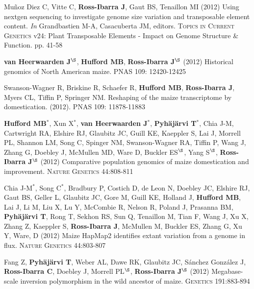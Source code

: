 \begin{etaremune}
\item Mu\~{n}oz Diez C, Vitte C, {\bf Ross-Ibarra J}, Gaut BS, Tenaillon MI (2012) Using nextgen sequencing to investigate genome size variation and transposable element content. \emph{In} Grandbastien M-A, Casacuberta JM, editors. \textsc{Topics in Current Genetics} v24: Plant Transposable Elements - Impact on Genome Structure \& Function. pp. 41-58


\item  {\bf van Heerwaarden J}$^\S$, {\bf Hufford MB}, {\bf Ross-Ibarra J}$^\S$ (2012) Historical genomics of North American maize. \textsc{PNAS} 109: 12420-12425


\item Swanson-Wagner R, Briskine R, Schaefer R, {\bf Hufford MB}, {\bf Ross-Ibarra J}, Myers CL, Tiffin P, Springer NM.  Reshaping of the maize transcriptome by domestication. (2012). \textsc{PNAS}  109: 11878-11883


\item {\bf Hufford MB}$^*$, Xun X$^*$, {\bf van Heerwaarden J}$^*$, {\bf Pyh\"aj\"arvi T}$^*$, Chia J-M, Cartwright RA, Elshire RJ, Glaubitz JC, Guill KE, Kaeppler S, Lai J, Morrell PL, Shannon LM, Song C, Spinger NM, Swanson-Wagner RA, Tiffin P, Wang J, Zhang G, Doebley J, McMullen MD, Ware D, Buckler ES$^\S$, Yang S$^\S$, {\bf Ross-Ibarra J}$^\S$ (2012) Comparative population genomics of maize domestication and improvement. \textsc{Nature Genetics} 44:808-811 %


\item  Chia J-M$^*$, Song C$^*$, Bradbury P, Costich D, de Leon N, Doebley JC, Elshire RJ, Gaut BS, Geller L, Glaubitz JC, Gore M, Guill KE, Holland J,  {\bf Hufford MB}, Lai J, Li M, Liu X, Lu Y, McCombie R, Nelson R, Poland J, Prasanna BM,  {\bf Pyh\"aj\"arvi T}, Rong T, Sekhon RS,  Sun Q, Tenaillon M, Tian F, Wang J, Xu X, Zhang Z, Kaeppler S, {\bf Ross-Ibarra J}, McMullen M, Buckler ES, Zhang G, Xu Y, Ware, D (2012) Maize HapMap2 identifies extant variation from a genome in flux. \textsc{Nature Genetics} 44:803-807 %


\item Fang Z, {\bf Pyh\"aj\"arvi T}, Weber AL, Dawe RK, Glaubitz JC, S\'{a}nchez Gonz\'{a}lez J, {\bf Ross-Ibarra C}, Doebley J, Morrell PL$^\S$, {\bf Ross-Ibarra J}$^\S$  (2012) Megabase-scale inversion polymorphism in the wild ancestor of maize. \textsc{Genetics} 191:883-894



\end{etaremune}
